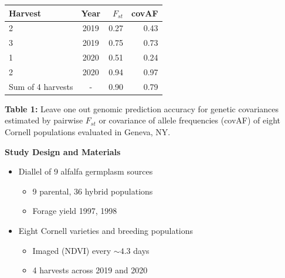 \documentclass[10pt, letterpaper]{article}
\begin{document}
\begin{minipage}{0.45\linewidth}
\begin{tabular*}{\hsize}{@{\extracolsep{\fill}}lcrr}
 Harvest & Year & $F_{st}$ & covAF \\ 
  \hline
  2 & 2019 & 0.27 & 0.43 \\ 
  3 & 2019 & 0.75 & 0.73 \\ 
  1 & 2020 & 0.51 & 0.24 \\ 
  2 & 2020 & 0.94 & 0.97 \\ 
  Sum of 4 harvests & - & 0.90 & 0.79 \\ 
   \hline
\end{tabular*}
\smallskip

\textbf{Table 1:} Leave one out genomic prediction accuracy for genetic covariances estimated by pairwise $F_{st}$ or covariance of allele frequencies (covAF) of eight Cornell populations evaluated in Geneva, NY.

\bigskip
\large{\textbf{Study Design and Materials}}
\raggedright{
\noindent \begin{itemize}
	\item Diallel of 9 alfalfa germplasm sources \parencite{segovia2004}
	\begin{itemize}
		\item 9 parental, 36 hybrid populations
		\item Forage yield 1997, 1998
	\end{itemize}
	\item Eight Cornell varieties and breeding populations
	\begin{itemize}
		\item Imaged (NDVI) every $\sim 4.3$ days
		\item 4 harvests across 2019 and 2020
	\end{itemize}
\end{itemize}
}
\end{minipage}%
\end{document}
